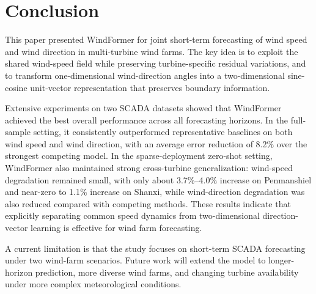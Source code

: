 \documentclass[journal,twoside,web]{ieeecolor}
\begin{document}




\section{Conclusion}
\label{sec:conclusion}

This paper presented WindFormer for joint short-term forecasting of wind speed and wind direction in multi-turbine wind farms. The key idea is to exploit the shared wind-speed field while preserving turbine-specific residual variations, and to transform one-dimensional wind-direction angles into a two-dimensional sine-cosine unit-vector representation that preserves boundary information.

Extensive experiments on two SCADA datasets showed that WindFormer achieved the best overall performance across all forecasting horizons. In the full-sample setting, it consistently outperformed representative baselines on both wind speed and wind direction, with an average error reduction of 8.2\% over the strongest competing model. In the sparse-deployment zero-shot setting, WindFormer also maintained strong cross-turbine generalization: wind-speed degradation remained small, with only about 3.7\%--4.0\% increase on Penmanshiel and near-zero to 1.1\% increase on Shanxi, while wind-direction degradation was also reduced compared with competing methods. These results indicate that explicitly separating common speed dynamics from two-dimensional direction-vector learning is effective for wind farm forecasting.

A current limitation is that the study focuses on short-term SCADA forecasting under two wind-farm scenarios. Future work will extend the model to longer-horizon prediction, more diverse wind farms, and changing turbine availability under more complex meteorological conditions.

\nocite{*}


\end{document}
